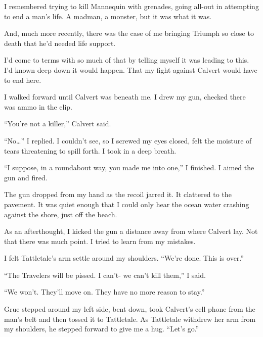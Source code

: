 I remembered trying to kill Mannequin with grenades, going all-out in attempting to end a man's life.  A madman, a monster, but it was what it was.



And, much more recently, there was the case of me bringing Triumph so close to death that he'd needed life support.



I'd come to terms with so much of that by telling myself it was leading to this.  I'd known deep down it would happen.  That my fight against Calvert would have to end here.



I walked forward until Calvert was beneath me.  I drew my gun, checked there was ammo in the clip.



``You're not a killer,'' Calvert said.



``No\ldots'' I replied.  I couldn't see, so I screwed my eyes closed, felt the moisture of tears threatening to spill forth.  I took in a deep breath.



``\ldotsBut I suppose, in a roundabout way, you made me into one,'' I finished.  I aimed the gun and fired.



The gun dropped from my hand as the recoil jarred it.  It clattered to the pavement.  It was quiet enough that I could only hear the ocean water crashing against the shore, just off the beach.



As an afterthought, I kicked the gun a distance away from where Calvert lay.  Not that there was much point.  I tried to learn from my mistakes.



I felt Tattletale's arm settle around my shoulders.  ``We're done.  This is over.''



``The Travelers will be pissed.  I can't- we can't kill them,'' I said.



``We won't.  They'll move on.  They have no more reason to stay.''



Grue stepped around my left side, bent down, took Calvert's cell phone from the man's belt and then tossed it to Tattletale.  As Tattletale withdrew her arm from my shoulders, he stepped forward to give me a hug.  ``Let's go.''



